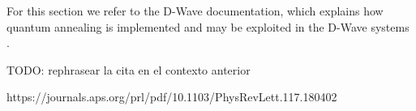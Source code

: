 For this section we refer to the D-Wave documentation, which explains how quantum annealing is implemented and may be exploited in the D-Wave systems \cite{DWaveDoc-QuantumAnnealing}.




TODO: rephrasear la cita en el contexto anterior











https://journals.aps.org/prl/pdf/10.1103/PhysRevLett.117.180402





